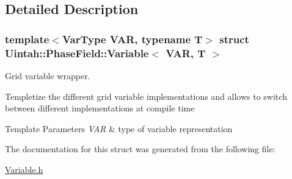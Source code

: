 \subsection{Detailed Description}
\subsubsection*{template$<$Var\+Type V\+AR, typename T$>$\newline
struct Uintah\+::\+Phase\+Field\+::\+Variable$<$ V\+A\+R, T $>$}

Grid variable wrapper. 

Templetize the different grid variable implementations and allows to switch between different implementations at compile time 
\begin{DoxyTemplParams}{Template Parameters}
{\em V\+AR} & type of variable representation \\
\hline
\end{DoxyTemplParams}


The documentation for this struct was generated from the following file\+:\begin{DoxyCompactItemize}
\item 
\hyperlink{Variable_8h}{Variable.\+h}\end{DoxyCompactItemize}
